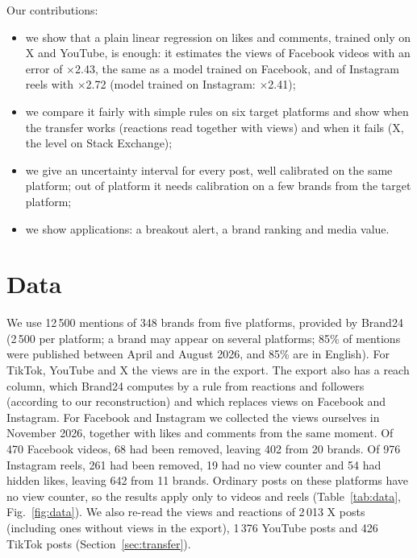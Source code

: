 \documentclass[10pt,a4paper]{article}
\newcommand{\x}[1]{$\times$#1}
\begin{document}
Our contributions:
\begin{itemize}
  \item we show that a plain linear regression on likes and comments, trained only on X and YouTube, is enough: it
        estimates the views of Facebook videos with an error of \x{2.43}, the same as a model trained on Facebook, and
        of Instagram reels with \x{2.72} (model trained on Instagram: \x{2.41});
  \item we compare it fairly with simple rules on six target platforms and show when the transfer works (reactions
        read together with views) and when it fails (X, the level on Stack Exchange);
  \item we give an uncertainty interval for every post, well calibrated on the same platform; out of platform it needs
        calibration on a few brands from the target platform;
  \item we show applications: a breakout alert, a brand ranking and media value.
\end{itemize}

\section{Data}

We use 12\,500 mentions of 348 brands from five platforms, provided by Brand24 (2\,500 per platform; a brand may appear
on several platforms; 85\% of mentions were published between April and August 2026, and 85\% are in English). For
TikTok, YouTube and X the views are in the export. The export also has a reach column, which Brand24 computes by a rule
from reactions and followers (according to our reconstruction) and which replaces views on Facebook and Instagram. For
Facebook and Instagram we collected the views ourselves in November 2026, together with likes and comments from the
same moment. Of 470 Facebook videos, 68 had been removed, leaving 402 from 20 brands. Of 976 Instagram reels, 261 had
been removed, 19 had no view counter and 54 had hidden likes, leaving 642 from 11 brands. Ordinary posts on these
platforms have no view counter, so the results apply only to videos and reels (Table~\ref{tab:data}, Fig.~\ref{fig:data}). We also re-read the views and reactions of 2\,013 X posts (including ones without views in the export), 1\,376 YouTube posts and 426 TikTok posts (Section~\ref{sec:transfer}).
\end{document}
